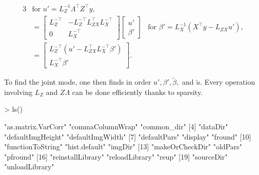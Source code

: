 \documentclass[article,shortnames]{jss}
\begin{document}
\begin{alignat*}{3}
  & \text{for } u' = L_Z^{-1}\Lambda^\top Z^\top y, \\
  & = \begin{bmatrix} L_Z^{-\top} & -L_Z^{-\top}L_{ZX}^\top
    L_X^{-\top} \\ 0 & L_X^{-\top} \end{bmatrix}
  \begin{bmatrix} u' \\ \beta' \end{bmatrix} & \text{for } \beta' =
  L_X^{-1}\left(X^\top y - L_{ZX} u'\right), \\
  & = \begin{bmatrix} L_Z^{-\top} \left( u' - L_{ZX}^\top L_X^{-\top}
      \beta' \right) \\ L_X^{-\top}\beta' \end{bmatrix}.
\end{alignat*}

\noindent To find the joint mode, one then finds in order $u', \beta',
\tilde{\beta},$ and $\tilde{u}$. Every operation involving $L_Z$ and
$Z\Lambda$ can be done efficiently thanks to sparsity.

\begin{Schunk}
\begin{Sinput}
> ls()
\end{Sinput}
\begin{Soutput}
 [1] "as.matrix.VarCorr" "commaColumnWrap"   "common_dir"       
 [4] "dataDir"           "defaultImgHeight"  "defaultImgWidth"  
 [7] "defaultPars"       "display"           "fround"           
[10] "functionToString"  "hist.default"      "imgDir"           
[13] "makeOrCheckDir"    "oldPars"           "pfround"          
[16] "reinstallLibrary"  "reloadLibrary"     "reup"             
[19] "sourceDir"         "unloadLibrary"    
\end{Soutput}
\end{Schunk}
\end{document}
